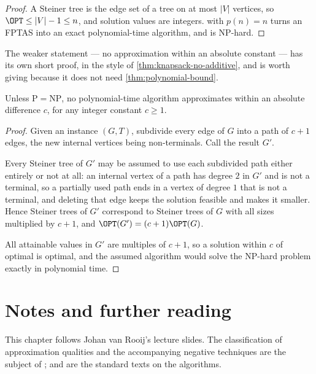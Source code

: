 \begin{proof}
A Steiner tree is the edge set of a tree on at most $|V|$ vertices, so
$\OPT \le |V| - 1 \le n$, and solution values are integers.
 with $p(n) = n$ turns an FPTAS into an exact
polynomial-time algorithm, and  is \textrm{NP}-hard.
\end{proof}

The weaker statement --- no approximation within an absolute constant --- has
its own short proof, in the style of \cref{thm:knapsack-no-additive}, and is
worth giving because it does not need \cref{thm:polynomial-bound}.

\begin{proposition}\label{prop:steiner-no-additive}
Unless $\mathrm{P} = \mathrm{NP}$, no polynomial-time algorithm approximates
 within an absolute difference $c$, for any integer constant
$c \ge 1$.
\end{proposition}

\begin{proof}
Given an instance $(G,T)$, subdivide every edge of $G$ into a path of $c+1$
edges, the new internal vertices being non-terminals. Call the result $G'$.

Every Steiner tree of $G'$ may be assumed to use each subdivided path either
entirely or not at all: an internal vertex of a path has degree $2$ in $G'$ and
is not a terminal, so a partially used path ends in a vertex of degree $1$ that
is not a terminal, and deleting that edge keeps the solution feasible and makes
it smaller. Hence Steiner trees of $G'$ correspond to Steiner trees of $G$ with
all sizes multiplied by $c+1$, and $\OPT(G') = (c+1)\OPT(G)$.

All attainable values in $G'$ are multiples of $c+1$, so a solution within $c$
of optimal is optimal, and the assumed algorithm would solve the
\textrm{NP}-hard problem  exactly in polynomial time.
\end{proof}

\section{Notes and further reading}
\label{sec:approx-ii-further-reading}

This chapter follows Johan van Rooij's lecture slides. The classification of
approximation qualities and the accompanying negative techniques are the
subject of \citet[Chapter~3]{Ausiello1999}; \citet{WilliamsonShmoys2011} and
\citet{Vazirani2001} are the standard texts on the algorithms.


